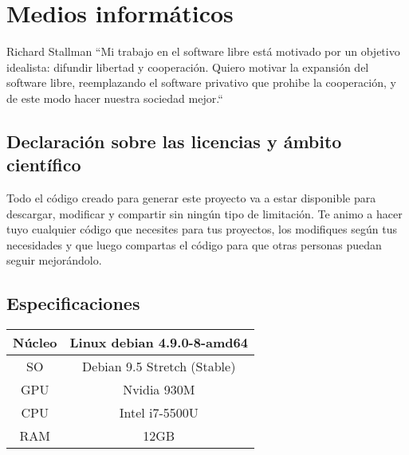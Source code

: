 \chapter*{Medios informáticos}
\begin{chapquote}{Richard Stallman}
	``Mi trabajo en el software libre está motivado por un objetivo idealista: difundir libertad y cooperación. Quiero motivar la expansión del software libre, reemplazando el software privativo que prohibe la cooperación, y de este modo hacer nuestra sociedad mejor.``
\end{chapquote}
\section*{Declaración sobre las licencias y ámbito científico}

Todo el código creado para generar este proyecto va a estar disponible para descargar, modificar y compartir sin ningún tipo de limitación. Te animo a hacer tuyo cualquier código que necesites para tus proyectos, los modifiques según tus necesidades y que luego compartas el código para que otras personas puedan seguir mejorándolo.

\section*{Especificaciones}
\begin{table}[htbp]
	\centering %
	\begin{tabular}{|c|c|}
		
		\hline
		Núcleo & Linux debian 4.9.0-8-amd64  \\ \hline
		SO & Debian 9.5 Stretch (Stable) \\ \hline
		GPU & Nvidia 930M \\ \hline
		CPU & Intel i7-5500U \\ \hline
		RAM & 12GB \\
		\hline
	\end{tabular}
	\label{tab:specs}
\end{table}